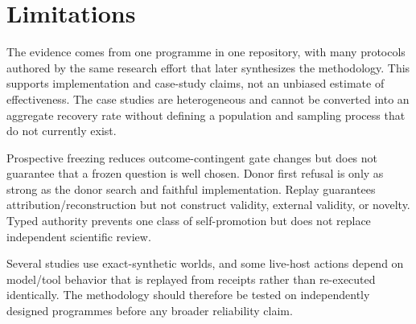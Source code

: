 \section{Limitations}

The evidence comes from one programme in one repository, with many protocols authored by the same research effort that later synthesizes the methodology. This supports implementation and case-study claims, not an unbiased estimate of effectiveness. The case studies are heterogeneous and cannot be converted into an aggregate recovery rate without defining a population and sampling process that do not currently exist.

Prospective freezing reduces outcome-contingent gate changes but does not guarantee that a frozen question is well chosen. Donor first refusal is only as strong as the donor search and faithful implementation. Replay guarantees attribution/reconstruction but not construct validity, external validity, or novelty. Typed authority prevents one class of self-promotion but does not replace independent scientific review.

Several studies use exact-synthetic worlds, and some live-host actions depend on model/tool behavior that is replayed from receipts rather than re-executed identically. The methodology should therefore be tested on independently designed programmes before any broader reliability claim.